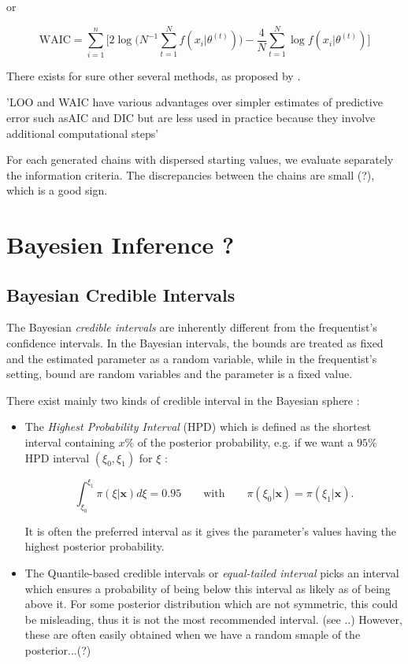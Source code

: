 \documentclass[11pt,a4paper,openany ]{book}
\begin{document}
or 

\begin{equation}
\text{WAIC} = \sum_{i=1}^n\Bigg[2\log \bigg(N^{-1}\sum_{t=1}^N f(x_i|\theta^{(t)})\bigg)-\frac{4}{N}\sum_{t=1}^N\log f(x_i|\theta^{(t)})\Bigg]
\end{equation}



There exists for sure other several methods, as proposed by \citet{gelman_understanding_2014}.
 
 'LOO and WAIC have various advantages over simpler estimates of predictive error such asAIC and DIC but are less used in practice because they involve additional computational steps' 


For each generated chains with dispersed starting values, we evaluate separately the information criteria. The discrepancies between the chains are small (?), which is a good sign. 

\section{Bayesien Inference ?}

\subsection{Bayesian Credible Intervals}\label{bayes_cred_int}

The Bayesian \emph{credible intervals} are inherently different from the frequentist's confidence intervals. In the Bayesian intervals, the bounds are treated as fixed and the estimated parameter as a random variable, while in the frequentist's setting, bound are random variables and the parameter is a fixed value.

There exist mainly two kinds of credible interval in the Bayesian sphere : 

\begin{itemize}
	\item The \emph{Highest Probability Interval} (HPD) which is defined as the shortest interval containing $x\%$ of the posterior probability, e.g. if we want a $95\%$ HPD interval $(\xi_0,\xi_1)$ for $\xi$ :
	
	\begin{equation} 
	\int_{\xi_0}^{\xi_1}\pi(\xi|\boldsymbol{x})d\xi=0.95 \qquad\text{with}\qquad \pi(\xi_0|\boldsymbol{x})=\pi(\xi_1|\boldsymbol{x}).
	\end{equation}
	
	It is often the preferred interval as it gives the parameter's values having the highest posterior probability. 
	\item The Quantile-based credible intervals or \emph{equal-tailed interval} picks an interval which ensures a probability of being below this interval as likely as of being above it. 
	For some posterior distribution which are not symmetric, this could be misleading, thus it is not the most recommended interval. (see ..)
	However, these are often easily obtained when we have a random smaple of the posterior...(?)
\end{itemize}
\end{document}
